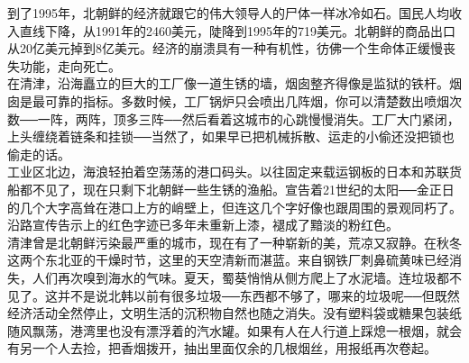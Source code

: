 \begin{multicols}{\theparacolNo}
到了1995年，北朝鲜的经济就跟它的伟大领导人的尸体一样冰冷如石。国民人均收入直线下降，从1991年的2460美元，陡降到1995年的719美元。北朝鲜的商品出口从20亿美元掉到8亿美元。经济的崩溃具有一种有机性，彷佛一个生命体正缓慢丧失功能，走向死亡。\\

在清津，沿海矗立的巨大的工厂像一道生锈的墙，烟囱整齐得像是监狱的铁杆。烟囱是最可靠的指标。多数时候，工厂锅炉只会喷出几阵烟，你可以清楚数出喷烟次数──一阵，两阵，顶多三阵──然后看着这城市的心跳慢慢消失。工厂大门紧闭，上头缠绕着链条和挂锁──当然了，如果早已把机械拆散、运走的小偷还没把锁也偷走的话。\\

工业区北边，海浪轻拍着空荡荡的港口码头。以往固定来载运钢板的日本和苏联货船都不见了，现在只剩下北朝鲜一些生锈的渔船。宣告着21世纪的太阳──金正日的几个大字高耸在港口上方的峭壁上，但连这几个字好像也跟周围的景观同朽了。沿路宣传告示上的红色字迹已多年未重新上漆，褪成了黯淡的粉红色。\\

清津曾是北朝鲜污染最严重的城市，现在有了一种崭新的美，荒凉又寂静。在秋冬这两个东北亚的干燥时节，这里的天空清新而湛蓝。来自钢铁厂刺鼻硫黄味已经消失，人们再次嗅到海水的气味。夏天，蜀葵悄悄从侧方爬上了水泥墙。连垃圾都不见了。这并不是说北韩以前有很多垃圾──东西都不够了，哪来的垃圾呢──但既然经济活动全然停止，文明生活的沉积物自然也随之消失。没有塑料袋或糖果包装纸随风飘荡，港湾里也没有漂浮着的汽水罐。如果有人在人行道上踩熄一根烟，就会有另一个人去捡，把香烟拨开，抽出里面仅余的几根烟丝，用报纸再次卷起。\\
\ifnum{}
	\end{multicols}
\fi